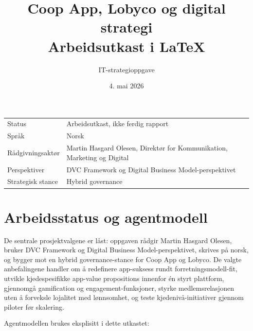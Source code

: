 \documentclass[12pt,a4paper]{article}
\title{Coop App, Lobyco og digital strategi\\
\large Arbeidsutkast i LaTeX}
\author{IT-strategioppgave}
\date{4. mai 2026}
\begin{document}
\maketitle

\begin{center}
\begin{tabular}{ll}
\toprule
Status & Arbeidsutkast, ikke ferdig rapport \\
Språk & Norsk \\
Rådgivningsaktør & Martin Hasgard Olesen, Direktør for Kommunikation, Marketing og Digital \\
Perspektiver & DVC Framework og Digital Business Model-perspektivet \\
Strategisk stance & Hybrid governance \\
\bottomrule
\end{tabular}
\end{center}

\tableofcontents
\newpage

\section*{Arbeidsstatus og agentmodell}

De sentrale prosjektvalgene er låst: oppgaven rådgir Martin Hasgard Olesen, bruker DVC Framework og Digital Business Model-perspektivet, skrives på norsk, og bygger mot en hybrid governance-stance for Coop App og Lobyco. De valgte anbefalingene handler om å redefinere app-suksess rundt forretningsmodell-fit, utvikle kjedespesifikke app-value propositions innenfor én styrt plattform, gjennomgå gamification og engagement-funksjoner, styrke medlemsrelasjonen uten å forveksle lojalitet med lønnsomhet, og teste kjedenivå-initiativer gjennom piloter før skalering.

Agentmodellen brukes eksplisitt i dette utkastet:
\end{document}

